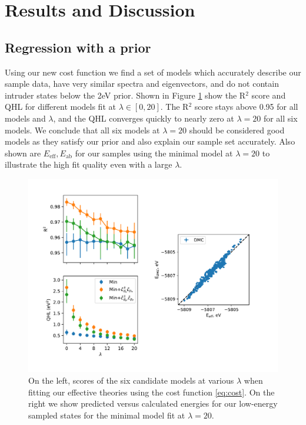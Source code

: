 \documentclass{article}
\begin{document}
\section{Results and Discussion}
\subsection{Regression with a prior}
Using our new cost function we find a set of models which accurately describe our sample data, have very similar spectra and eigenvectors, and do not contain intruder states below the 2eV prior. 
Shown in Figure \ref{fig:Prior} show the R$^2$ score and QHL for different models fit at $\lambda \in [0,20]$. 
The R$^2$ score stays above 0.95 for all models and $\lambda$, and the QHL converges quickly to nearly zero at $\lambda = 20$ for all six models. 
We conclude that all six models at $\lambda = 20$ should be considered good models as they satisfy our prior and also explain our sample set accurately. 
Also shown are $E_\text{eff}, E_\text{ab}$ for our samples using the minimal model at $\lambda = 20$ to illustrate the high fit quality even with a large $\lambda$.

\begin{figure}[H]
\centering
\includegraphics[width=0.7\linewidth]{../qwalk/old/ub3lyp_s1_/analysis/figs/prior_and_regr.pdf}
\caption{On the left, scores of the six candidate models at various $\lambda$ when fitting our effective theories using the cost function \eqref{eq:cost}. On the right we show predicted versus calculated energies for our low-energy sampled states for the minimal model fit at $\lambda = 20$.}
\label{fig:Prior}
\end{figure}
\end{document}

